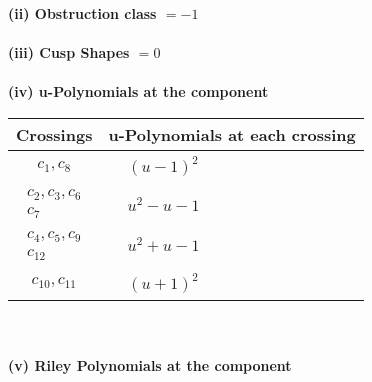 \documentclass[1p]{elsarticle_modified}
\theoremstyle{definition}
\begin{document}
\flushleft \textbf{(ii) Obstruction class $= -1$}\\~\\
\flushleft \textbf{(iii) Cusp Shapes $= 0$}\\~\\
\newpage\renewcommand{\arraystretch}{1}
\flushleft \textbf{(iv) u-Polynomials at the component}\newline \\
\begin{tabular}{m{50pt}|m{274pt}}
Crossings & \hspace{64pt}u-Polynomials at each crossing \\
\hline $$\begin{aligned}c_{1},c_{8}\end{aligned}$$&$\begin{aligned}
&(u-1)^2
\end{aligned}$\\
\hline $$\begin{aligned}c_{2},c_{3},c_{6}\\c_{7}\end{aligned}$$&$\begin{aligned}
&u^2- u-1
\end{aligned}$\\
\hline $$\begin{aligned}c_{4},c_{5},c_{9}\\c_{12}\end{aligned}$$&$\begin{aligned}
&u^2+u-1
\end{aligned}$\\
\hline $$\begin{aligned}c_{10},c_{11}\end{aligned}$$&$\begin{aligned}
&(u+1)^2
\end{aligned}$\\
\hline
\end{tabular}\\~\\
\newpage\renewcommand{\arraystretch}{1}
\flushleft \textbf{(v) Riley Polynomials at the component}\newline \\
\end{document}
